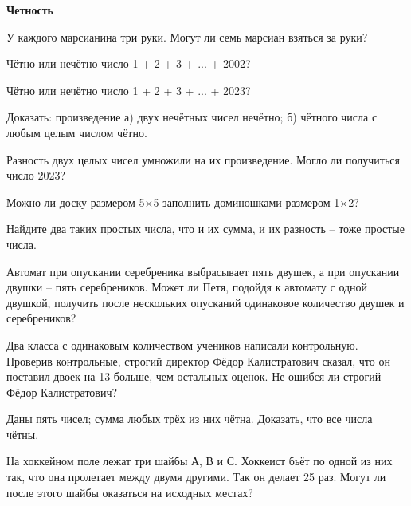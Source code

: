 \centerline{\bf \Huge Четность}

 У каждого марсианина три руки. Могут ли семь марсиан взяться за руки?

 Чётно или нечётно число 1 + 2 + 3 + ... + 2002?

 Чётно или нечётно число 1 + 2 + 3 + ... + 2023?

 Доказать: произведение
а) двух нечётных чисел нечётно;
б) чётного числа с любым целым числом чётно.

 Разность двух целых чисел умножили на их произведение. Могло ли получиться число 2023?

 Можно ли доску размером 5×5 заполнить доминошками размером 1×2?

 Найдите два таких простых числа, что и их сумма, и их разность – тоже простые числа.

 Автомат при опускании серебреника выбрасывает пять двушек, а при опускании двушки – пять серебреников. Может ли Петя, подойдя к автомату с одной двушкой, получить после нескольких опусканий одинаковое количество двушек и серебреников?

 Два класса с одинаковым количеством учеников написали контрольную. Проверив контрольные, строгий директор Фёдор Калистратович сказал, что он поставил двоек на 13 больше, чем остальных оценок. Не ошибся ли строгий Фёдор Калистратович?

 Даны пять чисел; сумма любых трёх из них чётна. Доказать, что все числа чётны.
  
 На хоккейном поле лежат три шайбы А, В и С. Хоккеист бьёт по одной из них так, что она пролетает между двумя другими.
Так он делает 25 раз. Могут ли после этого шайбы оказаться на исходных местах?